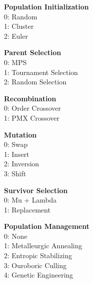 \documentclass[11pt]{article}
\begin{document}
\textbf{Population Initialization}\\
0: Random\\
1: Cluster\\
2: Euler

\textbf{Parent Selection}\\
0: MPS\\
1: Tournament Selection\\
2: Random Selection

\textbf{Recombination}\\
0: Order Crossover\\
1: PMX Crossover

\textbf{Mutation}\\
0: Swap\\
1: Insert\\
2: Inversion\\
3: Shift

\textbf{Survivor Selection}\\
0: Mu + Lambda\\
1: Replacement

\textbf{Population Management}\\
0: None\\
1: Metalleurgic Annealing\\
2: Entropic Stabilizing\\
3: Ouroboric Culling\\
4: Genetic Engineering
\end{document}
